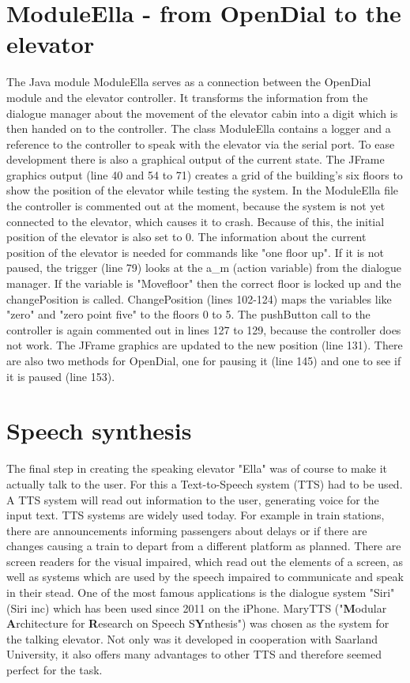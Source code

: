 \documentclass[a4paper, 12pt]{article}
\begin{document}
\section{ModuleElla - from OpenDial to the elevator}
The Java module ModuleElla serves as a connection between the OpenDial module and the elevator controller. 
It transforms the information from the dialogue manager about the movement of the elevator cabin into a digit which is then handed on to the controller. 
The class ModuleElla contains a logger and a reference to the controller to speak with the elevator via the serial port. 
To ease development there is also a graphical output of the current state.
The JFrame graphics output (line 40 and 54 to 71) creates a grid of the building's six floors to show the position of the elevator while testing the system. 
In the ModuleElla file the controller is commented out at the moment, because the system is not yet connected to the elevator, which causes it to crash. 
Because of this, the initial position of the elevator is also set to 0. 
The information about the current position of the elevator is needed for commands like "one floor up".
If it is not paused, the trigger (line 79) looks at the a\_m (action variable) from the dialogue manager. 
If the variable is "Movefloor" then the correct floor is locked up and the changePosition is called. 
ChangePosition (lines 102-124) maps the variables like "zero" and "zero point five" to the floors 0 to 5.
The pushButton call to the controller is again commented out in lines 127 to 129, because the controller does not work.
The JFrame graphics are updated to the new position (line 131). 
There are also two methods for OpenDial, one for pausing it (line 145) and one to see if it is paused (line 153).


\newpage
\section{Speech synthesis}
\label{sec:Speech_Synthesis}
The final step in creating the speaking elevator "Ella" was of course to make it actually talk to the user.
For this a Text-to-Speech system (TTS) had to be used. A TTS system will read out information to the user, generating voice for the input text. TTS systems are widely used today.
For example in train stations, there are announcements informing passengers about delays or if there are changes causing a train to depart from a different platform as planned.
There are screen readers for the visual impaired, which read out the elements of a screen, as well as systems which are used by the speech impaired to communicate and speak in their stead.
One of the most famous applications is the dialogue system "Siri" (Siri inc) which has been used since 2011 on the iPhone. \newline \newline
MaryTTS ("\textbf{M}odular \textbf{A}rchitecture for \textbf{R}esearch on Speech S\textbf{Y}nthesis") was chosen as the system for the talking elevator.
Not only was it developed in cooperation with Saarland University, it also offers many advantages to other TTS and therefore seemed perfect for the task.\newline
\end{document}
